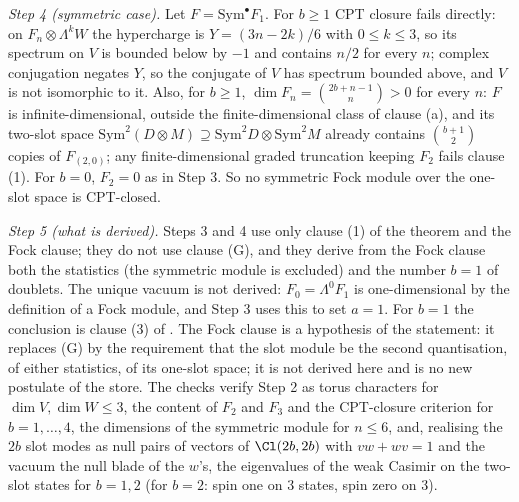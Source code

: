 \emph{Step 4 (symmetric case).} Let $F = \mathrm{Sym}^{\bullet}F_{1}$. For $b \ge 1$ CPT closure fails directly: on $F_{n} \otimes \Lambda^{k}W$ the hypercharge is $Y = (3n - 2k)/6$ with $0 \le k \le 3$, so its spectrum on $V$ is bounded below by $-1$ and contains $n/2$ for every $n$; complex conjugation negates $Y$, so the conjugate of $V$ has spectrum bounded above, and $V$ is not isomorphic to it. Also, for $b \ge 1$, $\dim F_{n} = \binom{2b + n - 1}{n} > 0$ for every $n$: $F$ is infinite-dimensional, outside the finite-dimensional class of clause (a), and its two-slot space $\mathrm{Sym}^{2}(D \otimes M) \supseteq \mathrm{Sym}^{2}D \otimes \mathrm{Sym}^{2}M$ already contains $\binom{b+1}{2}$ copies of $F_{(2,0)}$; any finite-dimensional graded truncation keeping $F_{2}$ fails clause (1). For $b = 0$, $F_{2} = 0$ as in Step 3. So no symmetric Fock module over the one-slot space is CPT-closed.

\emph{Step 5 (what is derived).} Steps 3 and 4 use only clause (1) of the theorem and the Fock clause; they do not use clause (G), and they derive from the Fock clause both the statistics (the symmetric module is excluded) and the number $b = 1$ of doublets. The unique vacuum is not derived: $F_{0} = \Lambda^{0}F_{1}$ is one-dimensional by the definition of a Fock module, and Step 3 uses this to set $a = 1$. For $b = 1$ the conclusion is clause (3) of . The Fock clause is a hypothesis of the statement: it replaces (G) by the requirement that the slot module be the second quantisation, of either statistics, of its one-slot space; it is not derived here and is no new postulate of the store. The checks verify Step 2 as torus characters for $\dim V, \dim W \le 3$, the content of $F_{2}$ and $F_{3}$ and the CPT-closure criterion for $b = 1, \dots, 4$, the dimensions of the symmetric module for $n \le 6$, and, realising the $2b$ slot modes as null pairs of vectors of $\Cl(2b, 2b)$ with $vw + wv = 1$ and the vacuum the null blade of the $w$'s, the eigenvalues of the weak Casimir on the two-slot states for $b = 1, 2$ (for $b = 2$: spin one on $3$ states, spin zero on $3$).
